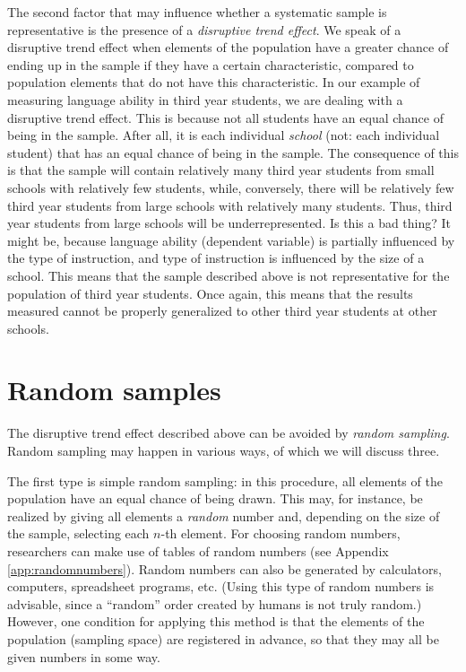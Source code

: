 \documentclass[
]{book}
\begin{document}
The second factor that may influence whether a systematic sample is representative is the presence of a \emph{disruptive trend effect}. We speak of a disruptive trend effect when elements of the population have a greater chance of ending up in the sample if they have a certain characteristic, compared to population elements that do not have this characteristic. In our example of measuring language ability in third year students, we are dealing with a disruptive trend effect. This is because not all students have an equal chance of being in the sample. After all, it is each individual \emph{school} (not: each individual student) that has an equal chance of being in the sample. The consequence of this is that the sample will contain relatively many third year students from small schools with relatively few students, while, conversely, there will be relatively few third year students from large schools with relatively many students. Thus, third year students from large schools will be underrepresented. Is this a bad thing? It might be, because language ability (dependent variable) is partially influenced by the type of instruction, and type of instruction is influenced by the size of a school. This means that the sample described above is not representative for the population of third year students. Once again, this means that the results measured cannot be properly generalized to other third year students at other schools.

\hypertarget{sec:random-samples}{%
\section{Random samples}\label{sec:random-samples}}

The disruptive trend effect described above can be avoided by \emph{random sampling}. Random sampling may happen in various ways, of which we will discuss three.

The first type is simple random sampling: in this procedure, all elements of the population have an equal chance of being drawn. This may, for instance, be realized by giving all elements a \emph{random} number and, depending on the size of the sample, selecting each \(n\)-th element. For choosing random numbers, researchers can make use of tables of random numbers (see Appendix \ref{app:randomnumbers}). Random numbers can also be generated by calculators, computers, spreadsheet programs, etc. (Using this type of random numbers is advisable, since a ``random'' order created by humans is not truly random.) However, one condition for applying this method is that the elements of the population (sampling space) are registered in advance, so that they may all be given numbers in some way.
\end{document}
